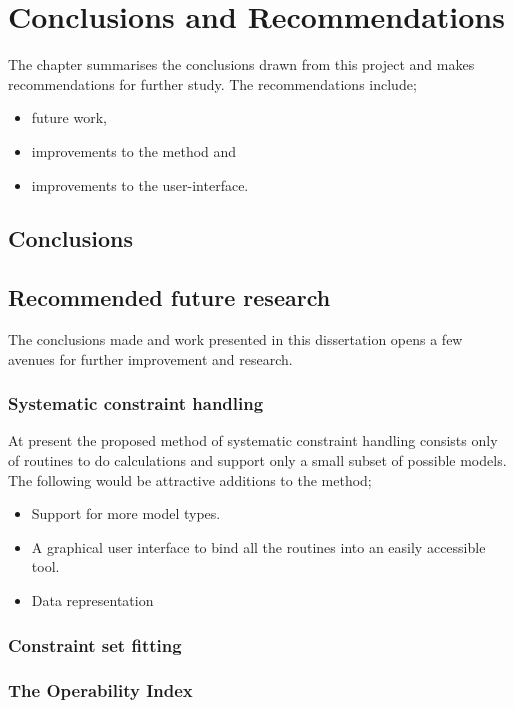 \chapter{Conclusions and Recommendations}\label{chap:conclusion}
\begin{overview}
  The chapter summarises the conclusions drawn from this project and makes 
  recommendations for further study. The recommendations include;
  \begin{itemize}
    \item future work,
    \item improvements to the method and
    \item improvements to the user-interface. 
  \end{itemize}
\end{overview}

\section{Conclusions}

\section{Recommended future research}
The conclusions made and work presented in this dissertation opens a few avenues for further improvement and research.
\subsection{Systematic constraint handling}
At present the proposed method of systematic constraint handling consists only of routines to do calculations and support only a small subset of possible models.
The following would be attractive additions to the method;
\begin{itemize}
  \item Support for more model types.
  \item A graphical user interface to bind all the routines into an easily accessible tool.
  \item Data representation
\end{itemize}
\subsection{Constraint set fitting}
\subsection{The Operability Index}


